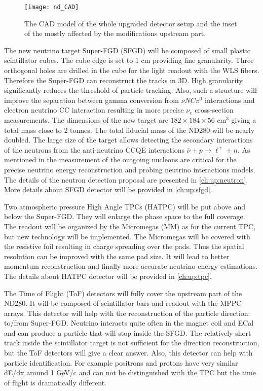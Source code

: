 \documentclass[main.tex]{subfiles}
\begin{document}
\begin{figure}[!ht]
  \centering
  \texttt{[image: nd\_CAD]}
  \caption{The CAD model of the whole upgraded detector setup and the inset of the mostly affected by the modifications upstream part.}
  \label{fig:up:nd_cad}
\end{figure}

The new neutrino target Super-FGD (SFGD) will be composed of small plastic scintillator cubes. The cube edge is set to 1 cm providing fine granularity. Three orthogonal holes are drilled in the cube for the light readout with the WLS fibers. Therefore the Super-FGD can reconstruct the tracks in 3D. High granularity significantly reduces the threshold of particle tracking. Also, such a structure will improve the separation between gamma conversion from $\nu NC\pi^0$ interactions and electron neutrino CC interaction resulting in more precise $\nu_e$ cross-section measurements. The dimensions of the new target are $182\times184\times56 \text{ cm}^3$ giving a total mass close to 2 tonnes. The total fiducial mass of the ND280 will be nearly doubled. The large size of the target allows detecting the secondary interactions of the neutrons from the anti-neutrino CCQE interactions $\overline{\nu}+p\to\ell^++n$. As mentioned in the  measurement of the outgoing nucleons are critical for the precise neutrino energy reconstruction and probing neutrino interactions models. The details of the neutron detection proposal are presented in \autoref{ch:up:neutron}. More details about SFGD detector will be provided in \autoref{ch:up:sfgd}.

Two atmospheric pressure High Angle TPCs (HATPC) will be put above and below the Super-FGD. They will enlarge the phase space to the full coverage. The readout will be organized by the Micromegas (MM) as for the current TPC, but new technology will be implemented. The Micromegas will be covered with the resistive foil resulting in charge spreading over the pads. Thus the spatial resolution can be improved with the same pad size. It will lead to better momentum reconstruction and finally more accurate neutrino energy estimations. The details about HATPC detector will be provided in \autoref{ch:up:tpc}.

The Time of Flight (ToF) detectors will fully cover the upstream part of the ND280. It will be composed of scintillator bars and readout with the MPPC arrays. This detector will help with the reconstruction of the particle direction: to/from Super-FGD. Neutrino interacts quite often in the magnet coil and ECal and can produce a particle that will stop inside the SFGD. The relatively short track inside the scintillator target is not sufficient for the direction reconstruction, but the ToF detectors will give a clear answer. Also, this detector can help with particle identification. For example positrons and protons have very similar dE/dx around 1 GeV/c and can not be distinguished with the TPC but the time of flight is dramatically different.
\end{document}
